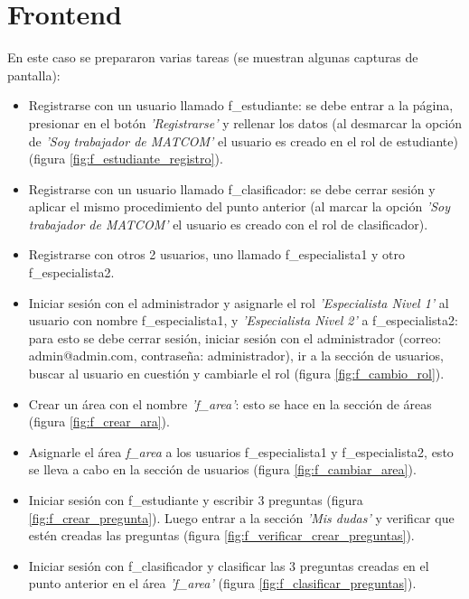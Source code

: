 \section{Frontend}

En este caso se prepararon varias tareas (se muestran algunas capturas de pantalla):
\begin{itemize}
	\item Registrarse con un usuario llamado f\_estudiante: se debe entrar a la página, presionar en el botón \textit{'Registrarse'} y rellenar los datos (al desmarcar la opción de \textit{'Soy trabajador de MATCOM'} el usuario es creado en el rol de estudiante) (figura \ref{fig:f_estudiante_registro}).
	
	\item Registrarse con un usuario llamado f\_clasificador: se debe cerrar sesión y aplicar el mismo procedimiento del punto anterior (al marcar la opción \textit{'Soy trabajador de MATCOM'} el usuario es creado con el rol de clasificador).
	
	\item Registrarse con otros 2 usuarios, uno llamado f\_especialista1 y otro f\_especialista2.
	
	\item Iniciar sesión con el administrador y asignarle el rol \textit{'Especialista Nivel 1'} al usuario con nombre f\_especialista1, y \textit{'Especialista Nivel 2'} a f\_especialista2: para esto se debe cerrar sesión, iniciar sesión con el administrador (correo: admin@admin.com, contraseña: administrador), ir a la sección de usuarios, buscar al usuario en cuestión y cambiarle el rol (figura \ref{fig:f_cambio_rol}).
	
	\item  Crear un área con el nombre \textit{'f\_area'}: esto se hace en la sección de áreas (figura \ref{fig:f_crear_ara}).
	
	\item Asignarle el área \textit{f\_area} a los usuarios f\_especialista1 y f\_especialista2, esto se lleva a cabo en la sección de usuarios (figura \ref{fig:f_cambiar_area}).
	
	\item Iniciar sesión con f\_estudiante y escribir 3 preguntas (figura \ref{fig:f_crear_pregunta}). Luego entrar a la sección \textit{'Mis dudas'} y verificar que estén creadas las preguntas (figura \ref{fig:f_verificar_crear_preguntas}).
	
	\item Iniciar sesión con f\_clasificador y clasificar las 3 preguntas creadas en el punto anterior en el área \textit{'f\_area'} (figura \ref{fig:f_clasificar_preguntas}).
	

\end{itemize}
